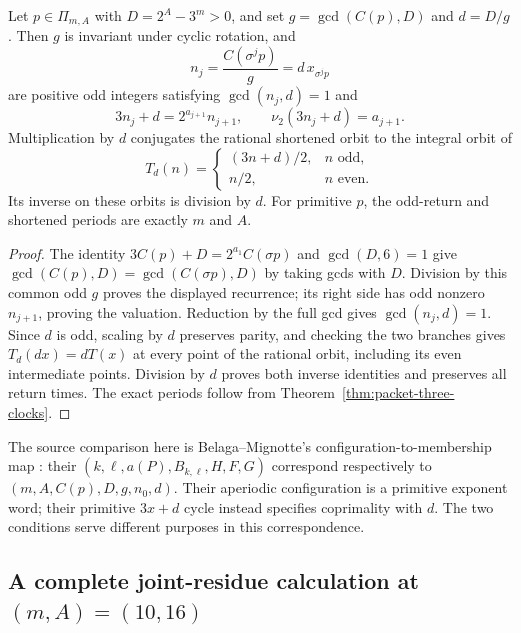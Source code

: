 \begin{proposition}
\label{prop:packet-reduced-denominator-cycles}
Let $p\in\Pi_{m,A}$ with $D=2^A-3^m>0$, and set
$g=\gcd(C(p),D)$ and $d=D/g$.  Then $g$ is invariant under cyclic
rotation, and
\[
 n_j=\frac{C(\sigma^jp)}g=d\,x_{\sigma^jp}
\]
are positive odd integers satisfying $\gcd(n_j,d)=1$ and
\[
 3n_j+d=2^{a_{j+1}}n_{j+1},\qquad
 \nu_2(3n_j+d)=a_{j+1}.
\]
Multiplication by $d$ conjugates the rational shortened orbit to the
integral orbit of
\[
 T_d(n)=\begin{cases}(3n+d)/2,&n\text{ odd},\\n/2,&n\text{ even}.
 \end{cases}
\]
Its inverse on these orbits is division by $d$.  For primitive $p$, the
odd-return and shortened periods are exactly $m$ and $A$.
\end{proposition}

\begin{proof}
The identity $3C(p)+D=2^{a_1}C(\sigma p)$ and $\gcd(D,6)=1$
give $\gcd(C(p),D)=\gcd(C(\sigma p),D)$ by taking gcds with $D$.
Division by this common odd $g$ proves the displayed recurrence; its right
side has odd nonzero $n_{j+1}$, proving the valuation.  Reduction by the
full gcd gives $\gcd(n_j,d)=1$.  Since $d$ is odd, scaling by $d$
preserves parity, and checking the two branches gives
$T_d(dx)=dT(x)$ at every point of the rational orbit, including its even
intermediate points.  Division by $d$ proves both inverse identities and
preserves all return times.  The exact periods follow from
Theorem~\ref{thm:packet-three-clocks}.
\end{proof}

The source comparison here is Belaga--Mignotte's configuration-to-membership
map \cite[Sections~7--8]{BelagaMignotte2000}: their
$(k,\ell,a(P),B_{k,\ell},H,F,G)$ correspond respectively to
$(m,A,C(p),D,g,n_0,d)$.  Their aperiodic configuration is a primitive
exponent word; their primitive $3x+d$ cycle instead specifies coprimality
with $d$.  The two conditions serve different purposes in this correspondence.

\subsection{A complete joint-residue calculation at
\texorpdfstring{$(m,A)=(10,16)$}{(m,A)=(10,16)}}

